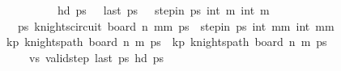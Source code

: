 \begin{isabellebody}
\ \ \ \ \ \ \ \ \ \ {\isachardoublequoteopen}hd\ ps\ {\isacharequal}{\kern0pt}\ {\isacharparenleft}{\kern0pt}{}{\isacharcomma}{\kern0pt}{}{\isacharparenright}{\kern0pt}{\isachardoublequoteclose}\ {\isachardoublequoteopen}last\ ps\ {\isacharequal}{\kern0pt}\ {\isacharparenleft}{\kern0pt}{}{\isacharcomma}{\kern0pt}{}{\isacharparenright}{\kern0pt}{\isachardoublequoteclose}\ {\isachardoublequoteopen}step{\isacharunderscore}{\kern0pt}in\ ps\ {\isacharparenleft}{\kern0pt}{}{\isacharcomma}{\kern0pt}int\ m\ {\isacharparenleft}{\kern0pt}{}{\isacharcomma}{\kern0pt}int\ m\isanewline
\ \ \ {\isachardoublequoteopen}{\isasymexists}ps{\isachardot}{\kern0pt}\ knights{\isacharunderscore}{\kern0pt}circuit\ {\isacharparenleft}{\kern0pt}board\ n\ {\isacharparenleft}{\kern0pt}mm\ ps\ {\isasymand}\ step{\isacharunderscore}{\kern0pt}in\ ps\ {\isacharparenleft}{\kern0pt}{}{\isacharcomma}{\kern0pt}int\ {\isacharparenleft}{\kern0pt}mm\ {\isacharparenleft}{\kern0pt}{}{\isacharcomma}{\kern0pt}int\ {\isacharparenleft}{\kern0pt}mm\isanewline
%
\isadelimproof
%
\endisadelimproof
%
\isatagproof
{}\isamarkupfalse%
\ {\isacharminus}{\kern0pt}\isanewline
\ \ \isamarkupfalse%
\ kp{}{\isacharcolon}{\kern0pt}\ {\isachardoublequoteopen}knights{\isacharunderscore}{\kern0pt}path\ {\isacharparenleft}{\kern0pt}board\ n\ m\ ps\ \ kp{}{\isacharcolon}{\kern0pt}\ {\isachardoublequoteopen}knights{\isacharunderscore}{\kern0pt}path\ {\isacharparenleft}{\kern0pt}board\ n\ m\ ps\ \isanewline
\ \ \ \ \ vs{\isacharcolon}{\kern0pt}\ {\isachardoublequoteopen}valid{\isacharunderscore}{\kern0pt}step\ {\isacharparenleft}{\kern0pt}last\ ps\ {\isacharparenleft}{\kern0pt}hd\ ps\isanewline

\end{isabellebody}
